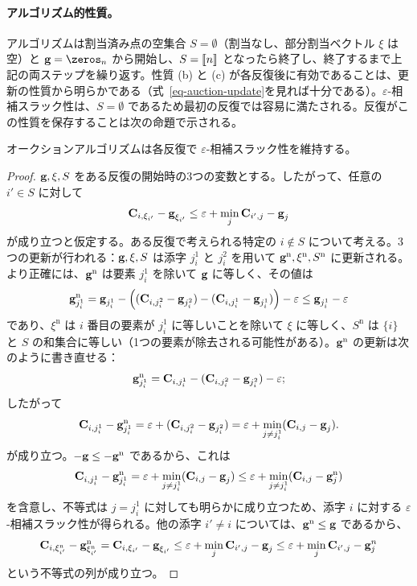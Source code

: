 \paragraph{アルゴリズム的性質。} アルゴリズムは割当済み点の空集合 $S=\emptyset$（割当なし、部分割当ベクトル $\xi$ は空）と $\gD=\zeros_n$ から開始し、$S=\llbracket n\rrbracket$ となったら終了し、終了するまで上記の両ステップを繰り返す。性質 {(b)} と {(c)} が各反復後に有効であることは、更新の性質から明らかである（式~\eqref{eq-auction-update}を見れば十分である）。$\varepsilon$-相補スラック性は、$S=\emptyset$ であるため最初の反復では容易に満たされる。反復がこの性質を保存することは次の命題で示される。
\begin{prop} オークションアルゴリズムは各反復で $\varepsilon$-相補スラック性を維持する。
\end{prop}
\begin{proof}
	$\mathrm{\textbf{g}},\xi,S$ をある反復の開始時の3つの変数とする。したがって、任意の $i'\in S$ に対して
	$$\mathrm{\textbf{C}}_{i,\xi_{i'}} - \mathrm{\textbf{g}}_{\xi_{i'}}  \leq \varepsilon + \min_{j} \mathrm{\textbf{C}}_{{i'},j} - \mathrm{\textbf{g}}_{j} $$
が成り立つと仮定する。ある反復で考えられる特定の $i\notin S$ について考える。3つの更新が行われる：$\mathrm{\textbf{g}},\xi,S$ は添字 $j^1_i$ と $j^2_i$ を用いて $\mathrm{\textbf{g}}^{\text{n}},\xi^{\text{n}},S^{\text{n}}$ に更新される。より正確には、$\mathrm{\textbf{g}}^{\text{n}}$ は要素 $j^1_i$ を除いて $\mathrm{\textbf{g}}$ に等しく、その値は
$$\mathrm{\textbf{g}}_{j^1_{i}}^\text{n} = \mathrm{\textbf{g}}_{j^1_{i}} - \left((\mathrm{\textbf{C}}_{i,j^2_{i}}-\mathrm{\textbf{g}}_{j^2_{i}})-(\mathrm{\textbf{C}}_{i,j^1_{i}}-\mathrm{\textbf{g}}_{j^1_{i}})\right)-\varepsilon \leq \mathrm{\textbf{g}}_{j^1_{i}}-\varepsilon$$
であり、$\xi^{\text{n}}$ は $i$ 番目の要素が $j^1_i$ に等しいことを除いて $\xi$ に等しく、$S^{\text{n}}$ は $\{i\}$ と $S$ の和集合に等しい（1つの要素が除去される可能性がある）。$\mathrm{\textbf{g}}^{\text{n}}$ の更新は次のように書き直せる：
$$\mathrm{\textbf{g}}^{\text{n}}_{j^1_i}= \mathrm{\textbf{C}}_{i,j^1_{i}} - (\mathrm{\textbf{C}}_{i,j^2_{i}}-\mathrm{\textbf{g}}_{j^2_{i}}) -\varepsilon;$$
したがって
$$\mathrm{\textbf{C}}_{i,j^1_{i}} - \mathrm{\textbf{g}}^{\text{n}}_{j^1_i}=  \varepsilon + (\mathrm{\textbf{C}}_{i,j^2_{i}}-\mathrm{\textbf{g}}_{j^2_{i}}) = \varepsilon+\min_{j\ne j^1_i} (\mathrm{\textbf{C}}_{i,j}-\mathrm{\textbf{g}}_{j}).$$
が成り立つ。$-\mathrm{\textbf{g}}\leq -\mathrm{\textbf{g}}^{\text{n}}$ であるから、これは
$$\mathrm{\textbf{C}}_{i,j^1_{i}} - \mathrm{\textbf{g}}^{\text{n}}_{j^1_i} = \varepsilon + \min_{j\ne j^1_i} (\mathrm{\textbf{C}}_{i,j}-\mathrm{\textbf{g}}_{j})\leq \varepsilon+\min_{j\ne j^1_i} (\mathrm{\textbf{C}}_{i,j}-\mathrm{\textbf{g}}^{\text{n}}_{j})$$
を含意し、不等式は $j=j^1_i$ に対しても明らかに成り立つため、添字 $i$ に対する $\varepsilon$-相補スラック性が得られる。他の添字 $i'\ne i$ については、$\mathrm{\textbf{g}}^{\text{n}}\leq\mathrm{\textbf{g}}$ であるから、
$$\mathrm{\textbf{C}}_{i,\xi^{\text{n}}_{i'}} - \mathrm{\textbf{g}}^{\text{n}}_{\xi^{\text{n}}_{i'}} = \mathrm{\textbf{C}}_{i,\xi_{i'}} - \mathrm{\textbf{g}}_{\xi_{i'}} \leq \varepsilon + \min_{j} \mathrm{\textbf{C}}_{{i'},j} - \mathrm{\textbf{g}}_{j} \leq \varepsilon + \min_{j} \mathrm{\textbf{C}}_{{i'},j} - \mathrm{\textbf{g}}^{n}_{j} $$
という不等式の列が成り立つ。
\end{proof}


